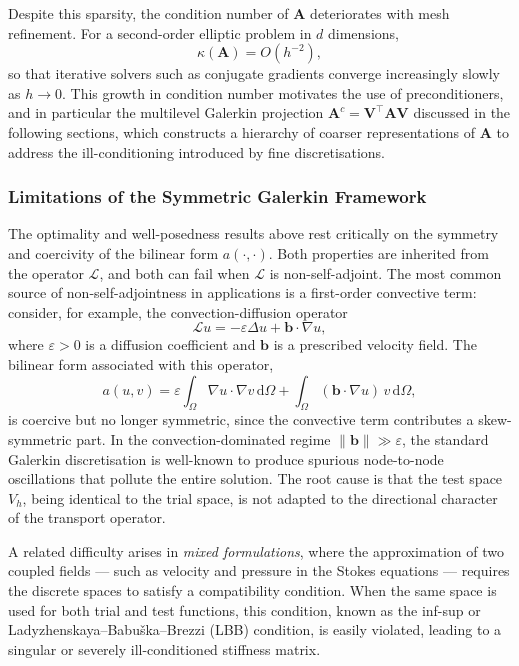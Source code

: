 \documentclass[12pt]{article}
\theoremstyle{definition}
\theoremstyle{remark}
\begin{document}
Despite this sparsity, the condition number of $\mathbf{A}$ deteriorates with
mesh refinement. For a second-order elliptic problem in $d$ dimensions,
\begin{equation}
    \kappa(\mathbf{A}) = O(h^{-2}),
\end{equation}
so that iterative solvers such as conjugate gradients converge increasingly
slowly as $h \to 0$. This growth in condition number motivates the use of
preconditioners, and in particular the multilevel Galerkin projection
$\mathbf{A}^c = \mathbf{V}^\top \mathbf{A}\mathbf{V}$ discussed in the
following sections, which constructs a hierarchy of coarser representations
of $\mathbf{A}$ to address the ill-conditioning introduced by fine
discretisations.

\subsubsection{Limitations of the Symmetric Galerkin Framework}\label{sec:galerkin-limits}

The optimality and well-posedness results above rest critically on the symmetry
and coercivity of the bilinear form $a(\cdot,\cdot)$. Both properties are
inherited from the operator $\mathcal{L}$, and both can fail when $\mathcal{L}$
is non-self-adjoint. The most common source of non-self-adjointness in
applications is a first-order convective term: consider, for example, the
convection-diffusion operator
\begin{equation}
    \mathcal{L}u = -\varepsilon \Delta u + \mathbf{b} \cdot \nabla u,
\end{equation}
where $\varepsilon > 0$ is a diffusion coefficient and $\mathbf{b}$ is a
prescribed velocity field. The bilinear form associated with this operator,
\begin{equation}
    a(u, v) = \varepsilon \int_\Omega \nabla u \cdot \nabla v \,\mathrm{d}\Omega
              + \int_\Omega (\mathbf{b} \cdot \nabla u)\, v \,\mathrm{d}\Omega,
\end{equation}
is coercive but no longer symmetric, since the convective term contributes a
skew-symmetric part. In the convection-dominated regime $\|\mathbf{b}\| \gg
\varepsilon$, the standard Galerkin discretisation is well-known to produce
spurious node-to-node oscillations that pollute the entire solution. The root
cause is that the test space $V_h$, being identical to the trial space, is
not adapted to the directional character of the transport operator.

A related difficulty arises in \emph{mixed formulations}, where the
approximation of two coupled fields --- such as velocity and pressure in the
Stokes equations --- requires the discrete spaces to satisfy a compatibility
condition. When the same space is used for both trial and test functions, this
condition, known as the inf-sup or Ladyzhenskaya--Babu\v{s}ka--Brezzi (LBB)
condition, is easily violated, leading to a singular or severely ill-conditioned
stiffness matrix.
\end{document}
